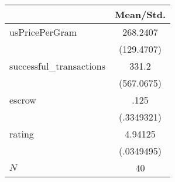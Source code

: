 {
\def\sym#1{\ifmmode^{#1}\else\(^{#1}\)\fi}
\begin{tabular}{l*{1}{c}}
\hline\hline
            &   Mean/Std.\\
\hline
usPricePerGram&    268.2407\\
            &  (129.4707)\\
successful\_transactions&       331.2\\
            &  (567.0675)\\
escrow      &        .125\\
            &  (.3349321)\\
rating      &     4.94125\\
            &  (.0349495)\\
\hline
\(N\)       &          40\\
\hline\hline
\end{tabular}
}

